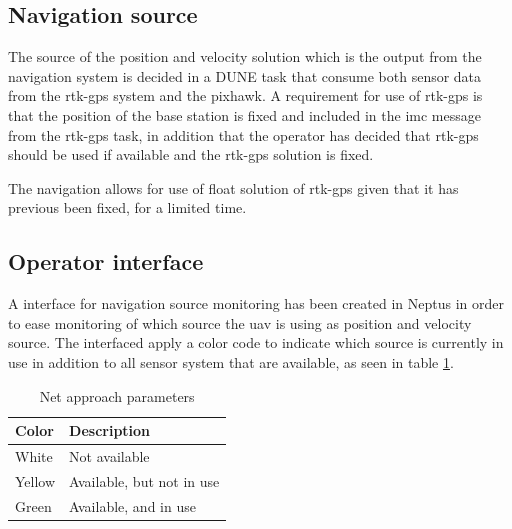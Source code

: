 \subsection{Navigation source}
The source of the position and velocity solution which is the output from the navigation system is decided in a DUNE task that consume both sensor data from the \gls{rtk-gps} system and the pixhawk. A requirement for use of \gls{rtk-gps} is that the position of the base station is fixed and included in the \gls{imc} message from the \gls{rtk-gps} task, in addition that the operator has decided that \gls{rtk-gps} should be used if available and the \gls{rtk-gps} solution is fixed.

The navigation allows for use of float solution of \gls{rtk-gps} given that it has previous been fixed, for a limited time. 

\subsection{Operator interface}
A interface for navigation source monitoring has been created in Neptus in order to ease monitoring of which source the \gls{uav} is using as position and velocity source. The interfaced apply a color code to indicate which source is currently in use in addition to all sensor system that are available, as seen in table \ref{Tb:Color Code}.

\begin{table}[H]
\begin{center}
    \begin{tabular}{ | l | l |}
    \hline
    \textbf{Color} & \textbf{Description} \\ \hline
    White & Not available \\ \hline
    Yellow & Available, but not in use \\ \hline
    Green & Available, and in use \\ \hline
    \end{tabular}
\end{center}
\caption{Net approach parameters }
\label{Tb:Color Code}
\end{table}

